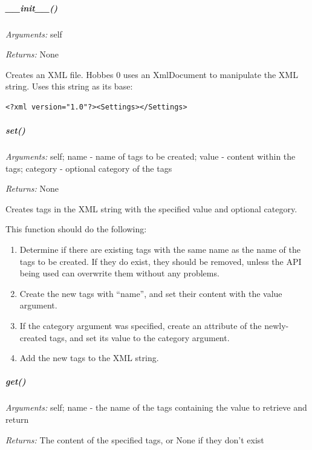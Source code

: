 \documentclass[12pt,letterpaper]{article}
\begin{document}
%
%
\subparagraph{\_\_init\_\_()}
\label{4.4.1.0.0}

\emph{Arguments:} self

\emph{Returns:} None

Creates an XML file. Hobbes 0 uses an XmlDocument to manipulate the XML string. Uses this string as its base:

\selectfont

\begin{lstlisting}
<?xml version="1.0"?><Settings></Settings>
\end{lstlisting}

\selectfont



%
%
\subparagraph{set()}
\label{4.4.1.0.1}

\emph{Arguments:} self; name - name of tags to be created; value - content within the tags; category - optional category of the tags

\emph{Returns:} None

Creates tags in the XML string with the specified value and optional category.

This function should do the following:

\begin{enumerate}

\item Determine if there are existing tags with the same name as the name of the tags to be created. If they do exist, they should be removed, unless the API being used can overwrite them without any problems.

\item Create the new tags with ``name'', and set their content with the value argument.

\item If the category argument was specified, create an attribute of the newly-created tags, and set its value to the category argument.

\item Add the new tags to the XML string.

\end{enumerate}



%
%
\subparagraph{get()}
\label{4.4.1.0.2}

\emph{Arguments:} self; name - the name of the tags containing the value to retrieve and return

\emph{Returns:} The content of the specified tags, or None if they don't exist
\end{document}
